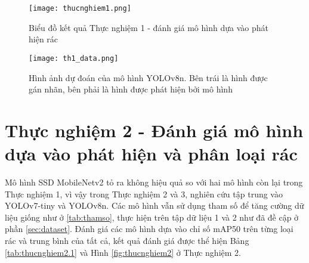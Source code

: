 \documentclass[../the.tex]{subfiles}
\begin{document}
\begin{figure}[H]
    \centering
    \texttt{[image: thucnghiem1.png]}
    \caption{Biểu đồ kết quả Thực nghiệm 1 - đánh giá mô hình dựa vào phát hiện rác}
    \label{fig:thucnghiem1}
\end{figure}


\begin{figure}[H]
    \centering
    \texttt{[image: th1\_data.png]}
    \caption{Hình ảnh dự đoán của mô hình YOLOv8n. Bên trái là hình được gán nhãn, bên phải là hình được phát hiện bởi mô hình}
    \label{fig:thucnghiem1.3}
\end{figure}

\section{Thực nghiệm 2 - Đánh giá mô hình dựa vào phát hiện và phân loại rác}

 {\fontsize{13}{12} \selectfont

  Mô hình SSD MobileNetv2 tỏ ra không hiệu quả so với hai mô hình còn lại trong Thực nghiệm 1, vì vậy trong Thực nghiệm 2 và 3, nghiên cứu tập trung vào YOLOv7-tiny và YOLOv8n.
  Các mô hình vẫn sử dụng tham số để tăng cường dữ liệu giống như ở \ref{tab:thamso}, thực hiện trên tập dữ liệu 1 và 2 như đã đề cập ở phần \ref{sec:dataset}.
  Đánh giá các mô hình dựa vào chỉ số mAP50 trên từng loại rác và trung bình của tất cả, kết quả đánh giá được thể hiện Bảng \ref{tab:thucnghiem2.1} và Hình \ref{fig:thucnghiem2} ở Thực nghiệm 2.

 }

\bigskip
\end{document}
